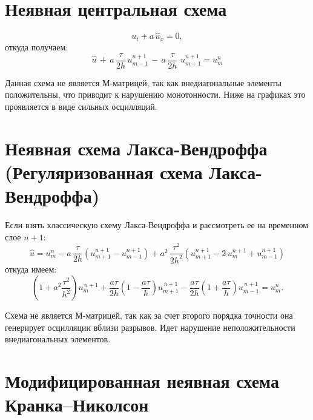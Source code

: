 \documentclass[a4paper,14pt]{extreport}
\begin{document}
\section*{Неявная центральная схема}
\begin{equation}
	u_t + a\,\hat{u}_{\mathring{x}}=0,
\end{equation}
откуда получаем:
\begin{equation*}
	 \hat{u} \, + \,a\,\frac{\tau}{2h}\,u_{m-1}^{n+1} \, - \,a\,\frac{\tau}{2h}\,\,u_{m+1}^{n+1} = u_m^n 
\end{equation*}

Данная схема не является М-матрицей, так как внедиагональные элементы положительны, что приводит к нарушению монотонности. Ниже на графиках это проявляется в виде сильных осцилляций.

\section*{Неявная схема Лакса-Вендроффа (Регуляризованная схема Лакса-Вендроффа)}
Если взять классическую схему Лакса-Вендроффа и рассмотреть ее на временном слое $n+1$:
\begin{equation*}
	\hat{u} = u_m^n - a\,\frac{\tau}{2h}\left(
	u_{m+1}^{n+1}-u_{m-1}^{n+1} \right)+
	a^2\,\frac{\tau^2}{2h^2}\left(
	u_{m+1}^{n+1} - 2\,u_m^{n+1} + u_{m-1}^{n+1} \right)
\end{equation*}
откуда имеем:
\begin{equation}
	\left( 1 + a^2 \frac{\tau^2}{h^2} \right) u_m^{\,n+1} 
	+ \frac{a\tau}{2h} \left( 1 - \frac{a\tau}{h} \right) u_{m+1}^{\,n+1} 
	- \frac{a\tau}{2h} \left( 1 + \frac{a\tau}{h} \right) u_{m-1}^{\,n+1} = u_m^n.
\end{equation}

Схема не является М-матрицей, так как за счет второго порядка точности она генерирует осцилляции вблизи разрывов. Идет нарушение неположительности внедиагональных элементов.

\section*{Модифицированная неявная схема Кранка–Николсон}
\end{document}
